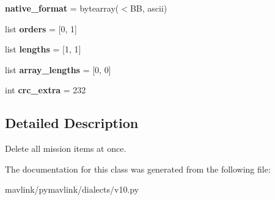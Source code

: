 \begin{DoxyCompactItemize}
{\bfseries native\+\_\+format} = bytearray(\textquotesingle{}$<$BB\textquotesingle{}, \textquotesingle{}ascii\textquotesingle{})
\item 
\mbox{\label{classpymavlink_1_1dialects_1_1v10_1_1MAVLink__mission__clear__all__message_a75b6c41ff11ba62fa5a940cdc9274e7a}} 
list {\bfseries orders} = \mbox{[}0, 1\mbox{]}
\item 
\mbox{\label{classpymavlink_1_1dialects_1_1v10_1_1MAVLink__mission__clear__all__message_a4893fce2fa32264bd20bc4bced8369e0}} 
list {\bfseries lengths} = \mbox{[}1, 1\mbox{]}
\item 
\mbox{\label{classpymavlink_1_1dialects_1_1v10_1_1MAVLink__mission__clear__all__message_ab5ef01db891583cc3f5bd398456e10d9}} 
list {\bfseries array\+\_\+lengths} = \mbox{[}0, 0\mbox{]}
\item 
\mbox{\label{classpymavlink_1_1dialects_1_1v10_1_1MAVLink__mission__clear__all__message_af5542622bcf2987a14a04c627d939248}} 
int {\bfseries crc\+\_\+extra} = 232
\end{DoxyCompactItemize}


\subsection{Detailed Description}
\begin{DoxyVerb}Delete all mission items at once.
\end{DoxyVerb}
 

The documentation for this class was generated from the following file\+:\begin{DoxyCompactItemize}
\item 
mavlink/pymavlink/dialects/v10.\+py\end{DoxyCompactItemize}
